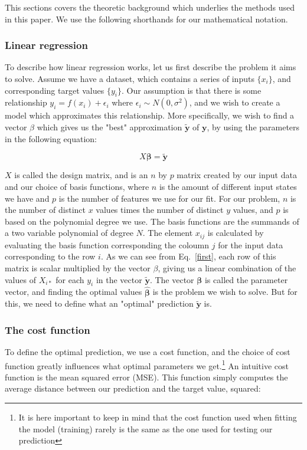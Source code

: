 \documentclass[twocolumn,10pt,cleanfoot]{asme2ej}
\begin{document}
This sections covers the theoretic background which underlies the methods used in this paper. We use the following shorthands for our mathematical notation.

\subsubsection{Linear regression}

To describe how linear regression works, let us first describe the problem it aims to solve. Assume we have a dataset, which contains a series of inputs $\{x_i\}$, and corresponding target values $\{y_i\}$. Our assumption is that there is some relationship $y_i = f(x_i) + \epsilon_i$ where $\epsilon_i \sim N(0,\sigma^2)$, and we wish to create a model which approximates this relationship. More specifically, we wish to find a vector $\beta$ which gives us the "best" approximation $\bm{\tilde{y}}$ of $\bm{y}$, by using the parameters in the following equation:

\begin{equation}
X \bm{\beta} = \bm{\tilde{y}}
\label{first}
\end{equation}


$X$ is called the design matrix, and is an $n$ by $p$ matrix created by our input data and our choice of basis functions, where $n$ is the amount of different input states we have and $p$ is the number of features we use for our fit. For our problem, $n$ is the number of distinct $x$ values times the number of distinct $y$ values, and $p$ is based on the polynomial degree we use. The basis functions are the summands of a two variable polynomial of degree $N$. The element $x_{ij}$ is calculated by evaluating the basis function corresponding the coloumn $j$ for the input data corresponding to the row $i$. As we can see from Eq.~\ref{first}, each row of this matrix is scalar multiplied by the vector $\beta$, giving us a linear combination of the values of $X_{i*}$ for each $y_i$ in the vector $\bm{\tilde{y}}$. The vector $\bm{\beta}$ is called the parameter vector, and finding the optimal values $\hat{\bm{\beta}}$ is the problem we wish to solve. But for this, we need to define what an "optimal" prediction $\bm{\tilde{y}}$ is.

\subsubsection{The cost function}

To define the optimal prediction, we use a cost function, and the choice of cost function greatly influences what optimal parameters we get.\footnote{It is here important to keep in mind that the cost function used when fitting the model (training) rarely is the same as the one used for testing our prediction} An intuitive cost function is the mean squared error (MSE). This function simply computes the average distance between our prediction and the target value, squared:
\end{document}
